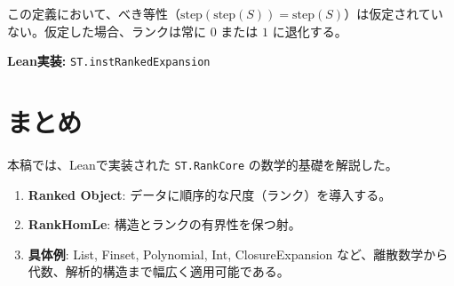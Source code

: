 \documentclass[a4paper,11pt]{article}
\theoremstyle{definition}
\theoremstyle{plain}
\newcommand{\code}[1]{\texttt{#1}}
\begin{document}
この定義において、べき等性（$\mathrm{step}(\mathrm{step}(S)) = \mathrm{step}(S)$）は仮定されていない。仮定した場合、ランクは常に $0$ または $1$ に退化する。

\noindent \textbf{Lean実装:} \code{ST.instRankedExpansion}

\section{まとめ}
本稿では、Leanで実装された \code{ST.RankCore} の数学的基礎を解説した。
\begin{enumerate}
    \item \textbf{Ranked Object}: データに順序的な尺度（ランク）を導入する。
    \item \textbf{RankHomLe}: 構造とランクの有界性を保つ射。
    \item \textbf{具体例}: List, Finset, Polynomial, Int, ClosureExpansion など、離散数学から代数、解析的構造まで幅広く適用可能である。
\end{enumerate}
\end{document}
